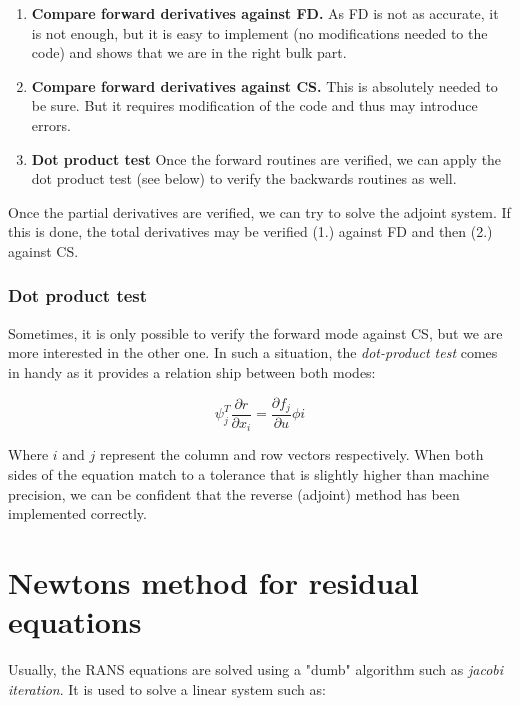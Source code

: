 \begin{enumerate}
    \item \textbf{Compare forward derivatives against FD.} As FD is not as
        accurate, it is not enough, but it is easy to implement (no
        modifications needed to the code) and shows that we are in the right
        bulk part.
    \item \textbf{Compare forward derivatives against CS.} This is absolutely
        needed to be sure. But it requires modification of the code and thus
        may introduce errors.

    \item \textbf{Dot product test} Once the forward routines are verified, we
        can apply the dot product test (see below) to verify the backwards
        routines as well.
\end{enumerate}

\noindent Once the partial derivatives are verified, we can try to solve the
adjoint system. If this is done, the total derivatives may be verified (1.)
against FD and then (2.) against CS.

\subsubsection{Dot product test}
Sometimes, it is only possible to verify the forward mode against CS, but we
are more interested in the other one. In such a situation, the
\textit{dot-product test} comes in handy as it provides a relation ship between
both modes:

\begin{equation}
    \psi_j^T \frac{\partial r}{\partial x_i} = 
    \frac{\partial f_j}{\partial u} \phi i
\end{equation}

\noindent Where $i$ and $j$ represent the column and row vectors respectively.
When both sides of the equation match to a tolerance that is slightly higher
than machine precision, we can be confident that the reverse (adjoint) method
has been implemented correctly.\cite{mdobook}








\section{Newtons method for residual equations}
\label{sec:newtons_method}
Usually, the RANS equations are solved using a "dumb" algorithm such as
\textit{jacobi iteration}. It is used to solve a linear system such as:

